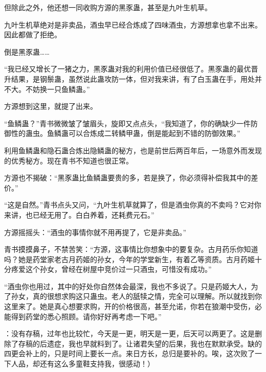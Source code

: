\begin{this_body}
但除此之外，他还想一同收购方源的黑豕蛊，甚至是九叶生机草。

九叶生机草绝对是非卖品，酒虫早已经合炼成了四味酒虫，方源想拿也拿不出来。因此都做了拒绝。

倒是黑豕蛊……

“我已经又增长了一猪之力，黑豕蛊对我的利用价值已经很低了。黑豕蛊的最优晋升结果，是钢鬃蛊，虽然说此蛊攻防一体，但对我来讲，有了白玉蛊在手，用处并不大。不妨换一只鱼鳞蛊。”

方源想到这里，就提了出来。

“鱼鳞蛊？”青书微微皱了皱眉头，旋即又点点头，“我知道了，你的确缺少一件防御性的蛊虫。鱼鳞蛊可以合炼成二转鳞甲蛊，倒是能起到不错的防御效果。”

利用鱼鳞蛊和隐石蛊合炼出隐鳞蛊的秘方，也是前世后两百年后，一场意外而发现的优秀秘方。现在青书不知道也很正常。

方源也不揭破：“黑豕蛊比鱼鳞蛊要贵的多，若是换了，你必须得补偿我其中的差价。”

“这是自然。”青书点头又问，“九叶生机草就算了，但是酒虫你真的不卖吗？它对你来讲，也已经无用了。白白养着，还耗费元石。”

方源摇摇头：“酒虫的事情你就不用再提了，它是非卖品。”

青书摸摸鼻子，不禁苦笑：“方源，这事情比你想象中的要复杂。古月药乐你知道吗？她是药堂家老古月药姬的孙女，今年的学堂新生，有着乙等资质。古月药姬十分疼爱这个孙女，曾经在树屋中竞价过一只酒虫，可惜没有成功。”

“酒虫你也用过，其中的好处你自然体会最深，我也不多说了。只是药姬大人，为了孙女，真的很想求购这只蛊虫。老人的舐犊之情，完全可以理解。所以就找到你这里来了。她是真心想要求购，开的价格很高，甚至允诺，你若在狼潮中受伤，必能得到药堂的悉心照顾。请你好好再考虑一下吧。”

：没有存稿，过年也比较忙，今天是一更，明天是一更，后天可以两更了。这是删除了存稿的后遗症，我也早就料到了。让诸君失望的后果，我也在默默承受。缺的四更会补上的，只是时间上要长一点。来日方长，总归是要补的。唉，这次败了一下人品，却还有这么多童鞋支持我，很感动！）

\end{this_body}

